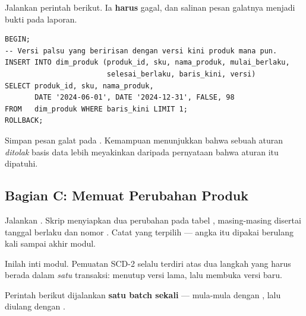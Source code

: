 
Jalankan perintah berikut. Ia \textbf{harus} gagal, dan salinan pesan galatnya
menjadi bukti pada laporan.

\begin{lstlisting}[style=sqlgaya]
BEGIN;
-- Versi palsu yang beririsan dengan versi kini produk mana pun.
INSERT INTO dim_produk (produk_id, sku, nama_produk, mulai_berlaku,
                        selesai_berlaku, baris_kini, versi)
SELECT produk_id, sku, nama_produk,
       DATE '2024-06-01', DATE '2024-12-31', FALSE, 98
FROM   dim_produk WHERE baris_kini LIMIT 1;
ROLLBACK;
\end{lstlisting}

Simpan pesan galat pada . Kemampuan menunjukkan
bahwa sebuah aturan \emph{ditolak} basis data lebih meyakinkan daripada
pernyataan bahwa aturan itu dipatuhi.

\subsection{Bagian C: Memuat Perubahan Produk}


Jalankan . Skrip
menyiapkan dua perubahan pada tabel ,
masing-masing disertai tanggal berlaku dan nomor . Catat
 yang terpilih --- angka itu dipakai berulang kali sampai
akhir modul.


Inilah inti modul. Pemuatan SCD-2 selalu terdiri atas dua langkah yang harus
berada dalam \emph{satu} transaksi: menutup versi lama, lalu membuka versi baru.

Perintah berikut dijalankan \textbf{satu batch sekali} --- mula-mula dengan
, lalu diulang dengan .

